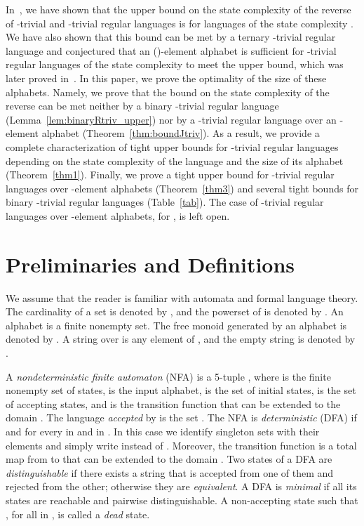 \documentclass[runningheads]{llncs}
\newcommand{\R}{}
\newcommand{\J}{}
\begin{document}
  In~\cite{ciaa2012}, we have shown that the upper bound on the state complexity of the reverse of \R-trivial and \J-trivial regular languages is  for languages of the state complexity . We have also shown that this bound can be met by a ternary \R-trivial regular language and conjectured that an ()-element alphabet is sufficient for \J-trivial regular languages of the state complexity  to meet the upper bound, which was later proved in~\cite{BrArXiv12}. In this paper, we prove the optimality of the size of these alphabets. Namely, we prove that the bound on the state complexity of the reverse can be met neither by a binary \R-trivial regular language (Lemma~\ref{lem:binaryRtriv_upper}) nor by a \J-trivial regular language over an -element alphabet (Theorem~\ref{thm:boundJtriv}). As a result, we provide a complete characterization of tight upper bounds for \R-trivial regular languages depending on the state complexity of the language and the size of its alphabet (Theorem~\ref{thm1}). Finally, we prove a tight upper bound for \J-trivial regular languages over -element alphabets (Theorem~\ref{thm3}) and several tight bounds for binary \J-trivial regular languages (Table~\ref{tab}). The case of \J-trivial regular languages over -element alphabets, for , is left open.
  

\section{Preliminaries and Definitions}
  We assume that the reader is familiar with automata and formal language theory. The cardinality of a set  is denoted by , and the powerset of  is denoted by . An alphabet is a finite nonempty set. The free monoid generated by an alphabet  is denoted by . A string over  is any element of , and the empty string is denoted by .

  A {\em nondeterministic finite automaton\/} (NFA) is a 5-tuple , where  is the finite nonempty set of states,  is the input alphabet,  is the set of initial states,  is the set of accepting states, and  is the transition function that can be extended to the domain . The language {\em accepted\/} by  is the set . The NFA  is {\em deterministic\/} (DFA) if  and  for every  in  and  in . In this case we identify singleton sets with their elements and simply write  instead of . Moreover, the transition function  is a total map from  to  that can be extended to the domain . Two states of a DFA are {\em distinguishable\/} if there exists a string  that is accepted from one of them and rejected from the other; otherwise they are {\em equivalent}. A DFA is {\em minimal\/} if all its states are reachable and pairwise distinguishable. A non-accepting state  such that , for all  in , is called a {\em dead\/} state.
  
\end{document}
